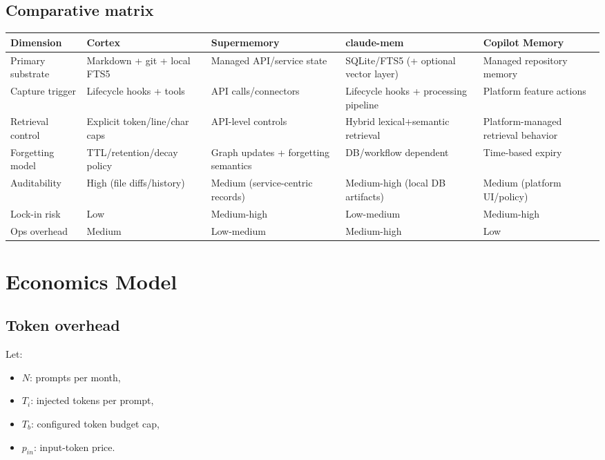 \documentclass[11pt]{article}
\begin{document}
\subsection{Comparative matrix}
\renewcommand{\arraystretch}{1.15}
\begin{longtable}{>{\raggedright\arraybackslash}p{} >{\raggedright\arraybackslash}p{} >{\raggedright\arraybackslash}p{} >{\raggedright\arraybackslash}p{} >{\raggedright\arraybackslash}p{}}
\toprule
\textbf{Dimension} & \textbf{Cortex} & \textbf{Supermemory} & \textbf{claude-mem} & \textbf{Copilot Memory} \\
\midrule
Primary substrate & Markdown + git + local FTS5 & Managed API/service state & SQLite/FTS5 (+ optional vector layer) & Managed repository memory \\
Capture trigger & Lifecycle hooks + tools & API calls/connectors & Lifecycle hooks + processing pipeline & Platform feature actions \\
Retrieval control & Explicit token/line/char caps & API-level controls & Hybrid lexical+semantic retrieval & Platform-managed retrieval behavior \\
Forgetting model & TTL/retention/decay policy & Graph updates + forgetting semantics & DB/workflow dependent & Time-based expiry \\
Auditability & High (file diffs/history) & Medium (service-centric records) & Medium-high (local DB artifacts) & Medium (platform UI/policy) \\
Lock-in risk & Low & Medium-high & Low-medium & Medium-high \\
Ops overhead & Medium & Low-medium & Medium-high & Low \\
\bottomrule
\end{longtable}

\section{Economics Model}
\subsection{Token overhead}
Let:
\begin{itemize}
  \item \(N\): prompts per month,
  \item \(T_i\): injected tokens per prompt,
  \item \(T_b\): configured token budget cap,
  \item \(p_{in}\): input-token price.
\end{itemize}
\end{document}

